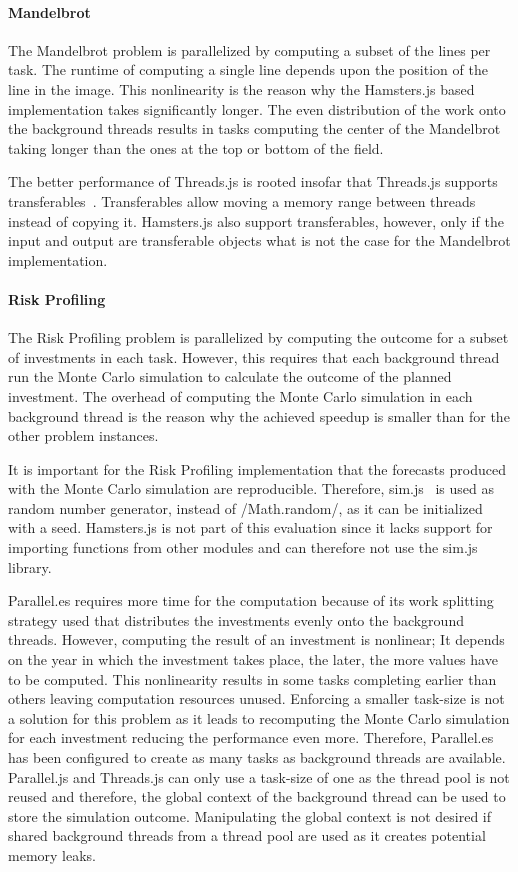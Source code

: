 \paragraph{Mandelbrot}
The Mandelbrot problem is parallelized by computing a subset of the lines per task. The runtime of computing a single line depends upon the position of the line in the image. This nonlinearity is the reason why the Hamsters.js based implementation takes significantly longer. The even distribution of the work onto the background threads results in tasks computing the center of the Mandelbrot taking longer than the ones at the top or bottom of the field. 

The better performance of Threads.js is rooted insofar that Threads.js supports transferables~\cite[Section 2.7.4]{w3cHtml5}. Transferables allow moving a memory range between threads instead of copying it. Hamsters.js also support transferables, however, only if the input and output are transferable objects what is not the case for the Mandelbrot implementation.

\paragraph{Risk Profiling}
The Risk Profiling problem is parallelized by computing the outcome for a subset of investments in each task. However, this requires that each background thread run the Monte Carlo simulation to calculate the outcome of the planned investment. The overhead of computing the Monte Carlo simulation in each background thread is the reason why the achieved speedup is smaller than for the other problem instances. 

It is important for the Risk Profiling implementation that the forecasts produced with the Monte Carlo simulation are reproducible. Therefore, sim.js~\cite{simjs} is used as random number generator, instead of \javascriptinline/Math.random/, as it can be initialized with a seed. Hamsters.js is not part of this evaluation since it lacks support for importing functions from other modules and can therefore not use the sim.js library. 

Parallel.es requires more time for the computation because of its work splitting strategy used that distributes the investments evenly onto the background threads. However, computing the result of an investment is nonlinear; It depends on the year in which the investment takes place, the later, the more values have to be computed. This nonlinearity results in some tasks completing earlier than others leaving computation resources unused. Enforcing a smaller task-size is not a solution for this problem as it leads to recomputing the Monte Carlo simulation for each investment reducing the performance even more. Therefore, Parallel.es has been configured to create as many tasks as background threads are available. Parallel.js and Threads.js can only use a task-size of one as the thread pool is not reused and therefore, the global context of the background thread can be used to store the simulation outcome. Manipulating the global context is not desired if shared background threads from a thread pool are used as it creates potential memory leaks.

